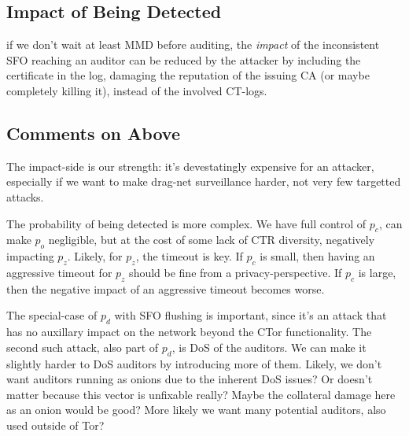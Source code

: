 \subsection{Impact of Being Detected}
if we don't wait at least MMD before auditing, the \emph{impact} of the
inconsistent SFO reaching an auditor can be reduced by the attacker by including
the certificate in the log, damaging the reputation of the issuing CA (or maybe
completely killing it), instead of the involved CT-logs.

\subsection{Comments on Above}
The impact-side is our strength: it's devestatingly expensive for an attacker,
especially if we want to make drag-net surveillance harder, not very few
targetted attacks.

The probability of being detected is more complex. We have full control of
$p_c$, can make $p_o$ negligible, but at the cost of some lack of CTR diversity,
negatively impacting $p_z$. Likely, for $p_z$, the timeout is key. If $p_c$ is
small, then having an aggressive timeout for $p_z$ should be fine from a
privacy-perspective. If $p_c$ is large, then the negative impact of an
aggressive timeout becomes worse. 

The special-case of $p_d$ with SFO flushing is important, since it's an attack
that has no auxillary impact on the network beyond the CTor functionality. The
second such attack, also part of $p_d$, is DoS of the auditors. We can make it
slightly harder to DoS auditors by introducing more of them. Likely, we don't
want auditors running as onions due to the inherent DoS issues? Or doesn't
matter because this vector is unfixable really? Maybe the collateral damage here
as an onion would be good? More likely we want many potential auditors, also
used outside of Tor?